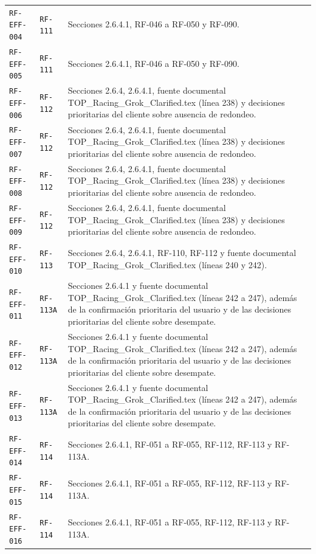 \documentclass[10pt,letterpaper]{article}
\begin{document}
\begin{landscape}
\begin{longtable}{P{2.7cm}P{2.6cm}P{15.7cm}}
\texttt{RF-EFF-004} & \texttt{RF-111} & Secciones 2.6.4.1, RF-046 a RF-050 y RF-090.\\
\texttt{RF-EFF-005} & \texttt{RF-111} & Secciones 2.6.4.1, RF-046 a RF-050 y RF-090.\\
\texttt{RF-EFF-006} & \texttt{RF-112} & Secciones 2.6.4, 2.6.4.1, fuente documental TOP\_Racing\_Grok\_Clarified.tex (línea 238) y decisiones prioritarias del cliente sobre ausencia de redondeo.\\
\texttt{RF-EFF-007} & \texttt{RF-112} & Secciones 2.6.4, 2.6.4.1, fuente documental TOP\_Racing\_Grok\_Clarified.tex (línea 238) y decisiones prioritarias del cliente sobre ausencia de redondeo.\\
\texttt{RF-EFF-008} & \texttt{RF-112} & Secciones 2.6.4, 2.6.4.1, fuente documental TOP\_Racing\_Grok\_Clarified.tex (línea 238) y decisiones prioritarias del cliente sobre ausencia de redondeo.\\
\texttt{RF-EFF-009} & \texttt{RF-112} & Secciones 2.6.4, 2.6.4.1, fuente documental TOP\_Racing\_Grok\_Clarified.tex (línea 238) y decisiones prioritarias del cliente sobre ausencia de redondeo.\\
\texttt{RF-EFF-010} & \texttt{RF-113} & Secciones 2.6.4, 2.6.4.1, RF-110, RF-112 y fuente documental TOP\_Racing\_Grok\_Clarified.tex (líneas 240 y 242).\\
\texttt{RF-EFF-011} & \texttt{RF-113A} & Secciones 2.6.4.1 y fuente documental TOP\_Racing\_Grok\_Clarified.tex (líneas 242 a 247), además de la confirmación prioritaria del usuario y de las decisiones prioritarias del cliente sobre desempate.\\
\texttt{RF-EFF-012} & \texttt{RF-113A} & Secciones 2.6.4.1 y fuente documental TOP\_Racing\_Grok\_Clarified.tex (líneas 242 a 247), además de la confirmación prioritaria del usuario y de las decisiones prioritarias del cliente sobre desempate.\\
\texttt{RF-EFF-013} & \texttt{RF-113A} & Secciones 2.6.4.1 y fuente documental TOP\_Racing\_Grok\_Clarified.tex (líneas 242 a 247), además de la confirmación prioritaria del usuario y de las decisiones prioritarias del cliente sobre desempate.\\
\texttt{RF-EFF-014} & \texttt{RF-114} & Secciones 2.6.4.1, RF-051 a RF-055, RF-112, RF-113 y RF-113A.\\
\texttt{RF-EFF-015} & \texttt{RF-114} & Secciones 2.6.4.1, RF-051 a RF-055, RF-112, RF-113 y RF-113A.\\
\texttt{RF-EFF-016} & \texttt{RF-114} & Secciones 2.6.4.1, RF-051 a RF-055, RF-112, RF-113 y RF-113A.\\

\end{longtable}
\end{landscape}
\end{document}
